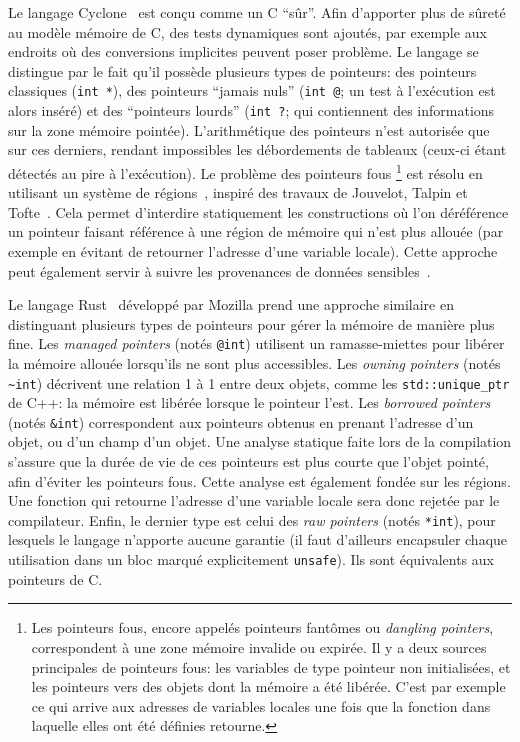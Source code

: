 Le langage Cyclone~\cite{cyclone-safety} est conçu comme un C \enquote{sûr}.
Afin d'apporter plus de sûreté au modèle mémoire de C, des tests dynamiques sont
ajoutés, par exemple aux endroits où des conversions implicites peuvent poser
problème. Le langage se distingue par le fait qu'il possède plusieurs types de
pointeurs: des pointeurs classiques (\texttt{int *}), des pointeurs
\enquote{jamais nuls} (\texttt{int @}; un test à l'exécution est alors inséré)
et des \enquote{pointeurs lourds} (\verb!int ?!; qui contiennent des
informations sur la zone mémoire pointée). L'arithmétique des pointeurs n'est
autorisée que sur ces derniers, rendant impossibles les débordements de tableaux
(ceux-ci étant détectés au pire à l'exécution). Le problème des pointeurs fous
\footnote{
    Les pointeurs fous, encore appelés pointeurs fantômes ou \emph{dangling
    pointers}, correspondent à une zone mémoire invalide ou expirée. Il y a deux
    sources principales de pointeurs fous: les variables de type pointeur non
    initialisées, et les pointeurs vers des objets dont la mémoire a été libérée.
    C'est par exemple ce qui arrive aux adresses de variables locales une fois
    que la fonction dans laquelle elles ont été définies retourne.
}
est résolu en utilisant un système de régions~\cite{cyclone-regions}, inspiré
des travaux de Jouvelot, Talpin et \linebreak Tofte~\cite{jfp92,popl94}. Cela
permet d'interdire statiquement les constructions où l'on déréférence un
pointeur faisant référence à une région de mémoire qui n'est plus allouée (par
exemple en évitant de retourner l'adresse d'une variable locale). Cette approche
peut également servir à suivre les provenances de données
sensibles~\cite{regPtr}.

Le langage Rust~ développé par Mozilla prend une approche similaire
en distinguant plusieurs types de pointeurs pour gérer la mémoire de manière
plus fine. Les \emph{managed pointers} (notés \texttt{@int}) utilisent un
ramasse-miettes pour libérer la mémoire allouée lorsqu'ils ne sont plus
accessibles. Les \emph{owning pointers} (notés \texttt{\textasciitilde{}int})
décrivent une relation 1 à 1 entre deux objets, comme les
\texttt{std::unique\_ptr} de C++: la mémoire est libérée lorsque le pointeur
l'est. Les \emph{borrowed pointers} (notés \texttt{\&int}) correspondent aux
pointeurs obtenus en prenant l'adresse d'un objet, ou d'un champ d'un objet. Une
analyse statique faite lors de la compilation s'assure que la durée de vie de
ces pointeurs est plus courte que l'objet pointé, afin d'éviter les pointeurs
fous. Cette analyse est également fondée sur les régions. Une fonction qui
retourne l'adresse d'une variable locale sera donc rejetée par le compilateur.
Enfin, le dernier type est celui des \emph{raw pointers} (notés \texttt{*int}),
pour lesquels le langage n'apporte aucune garantie (il faut d'ailleurs
encapsuler chaque utilisation dans un bloc marqué explicitement
\texttt{unsafe}). Ils sont équivalents aux pointeurs de C.

